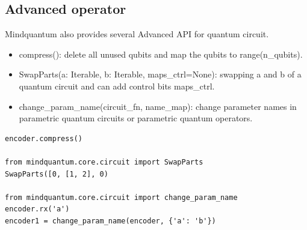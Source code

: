 \subsection{Advanced operator}
Mindquantum also provides several Advanced API for quantum circuit.
\begin{itemize}
    \item compress(): delete all unused qubits and map the qubits to range(n\_qubits).
    \item SwapParts(a: Iterable, b: Iterable, maps\_ctrl=None): swapping a and b of a quantum circuit and can add control bits maps\_ctrl.
    \item change\_param\_name(circuit\_fn, name\_map): change parameter names in parametric quantum circuits or parametric quantum operators.
\end{itemize}
\begin{lstlisting}
encoder.compress()

from mindquantum.core.circuit import SwapParts
SwapParts([0, [1, 2], 0) 

from mindquantum.core.circuit import change_param_name
encoder.rx('a')
encoder1 = change_param_name(encoder, {'a': 'b'})  
\end{lstlisting}